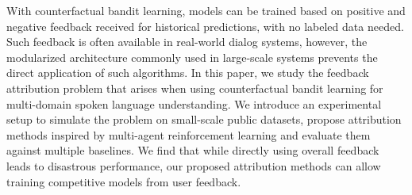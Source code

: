 With counterfactual bandit learning, models can be trained based on positive and negative feedback received for historical predictions, with no labeled data needed. Such feedback is often available in real-world dialog systems, however, the modularized architecture commonly used in large-scale systems prevents the direct application of such algorithms. In this paper, we study the feedback attribution problem that arises when using counterfactual bandit learning for multi-domain spoken language understanding. We introduce an experimental setup to simulate the problem on small-scale public datasets, propose attribution methods inspired by multi-agent reinforcement learning and evaluate them against multiple baselines. We find that while directly using overall feedback leads to disastrous performance, our proposed attribution methods can allow training competitive models from user feedback.
